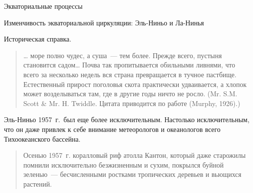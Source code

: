 \begin{chapter}{Экваториальные процессы}
\begin{section}{Изменчивость экваториальной циркуляции: Эль-Ниньо и Ла-Нинья}
\begin{paragraph}{Историческая справка.}
\begin{quotation}
\ldots{} море полно чудес, а суша~--- тем более. Прежде всего, пустыня 
становится садом\ldots{}  Почва так пропитывается обильными ливнями, что всего
за несколько недель вся страна превращается в тучное пастбище. Естественный
прирост поголовья скота практически удваивается, а хлопок может возделываться
там, где в другие годы ничто не росло. 
(Mr. S.M. Scott \& Mr. H. Twiddle. Цитата приводится по работе (Murphy, 1926).)
%
\end{quotation}

Эль-Ниньо 1957~г.\ был еще более исключительным. Настолько исключительным,
что он даже привлек к себе внимание метеорологов и океанологов всего 
Тихоокеанского бассейна.
%
\begin{quotation}
Осенью 1957~г. коралловый риф атолла Кантон, который даже старожилы помнили
исключительно безжизненным и сухим, покрылся буйной зеленью~--- бесчисленными
ростками тропических деревьев и вьющихся растений.
%


\end{quotation}
\end{paragraph}
\end{section}
\end{chapter}
